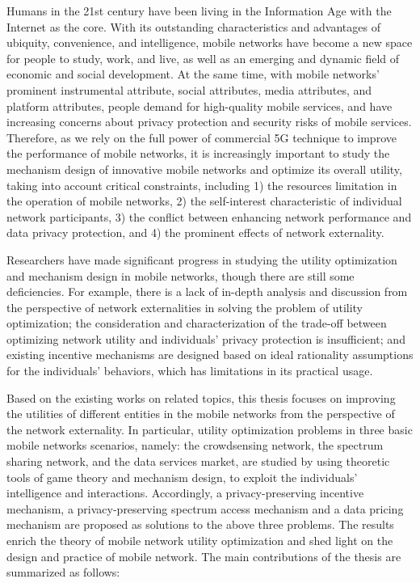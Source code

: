 \begin{englishabstract}

	Humans in the 21st century have been living in the Information Age with the Internet as the core. With its outstanding characteristics and advantages of ubiquity, convenience, and intelligence, mobile networks have become a new space for people to study, work, and live, as well as an emerging and dynamic field of economic and social development. At the same time, with mobile networks' prominent instrumental attribute, social attributes, media attributes, and platform attributes, people demand for high-quality mobile services, and have increasing concerns about privacy protection and security risks of mobile services. Therefore, as we rely on the full power of commercial 5G technique to improve the performance of mobile networks, it is increasingly important to study the mechanism design of innovative mobile networks and optimize its overall utility, taking into account critical constraints, including 1) the resources limitation in the operation of mobile networks, 2) the self-interest characteristic of individual network participants, 3) the conflict between enhancing network performance and data privacy protection, and 4) the prominent effects of network externality. 
	
	Researchers have made significant progress in studying the utility optimization and mechanism design in mobile networks, though there are still some deficiencies. For example, there is a lack of in-depth analysis and discussion from the perspective of network externalities in solving the problem of utility optimization; the consideration and characterization of the trade-off between optimizing network utility and individuals' privacy protection is insufficient; and existing incentive mechanisms are designed based on ideal rationality assumptions for the individuals' behaviors, which has limitations in its practical usage.
	
	Based on the existing works on related topics, this thesis focuses on improving the utilities of different entities in the mobile networks from the perspective of the network externality. In particular, utility optimization problems in three basic mobile networks scenarios, namely: the crowdsensing network, the spectrum sharing network, and the data services market, are studied by using theoretic tools of game theory and mechanism design, to exploit the individuals' intelligence and interactions. Accordingly, a privacy-preserving incentive mechanism, a privacy-preserving spectrum access mechanism and a data pricing mechanism are proposed as solutions to the above three problems. The results enrich the theory of mobile network utility optimization and shed light on the design and practice of mobile network. The main contributions of the thesis are summarized as follows: 


\end{englishabstract}
